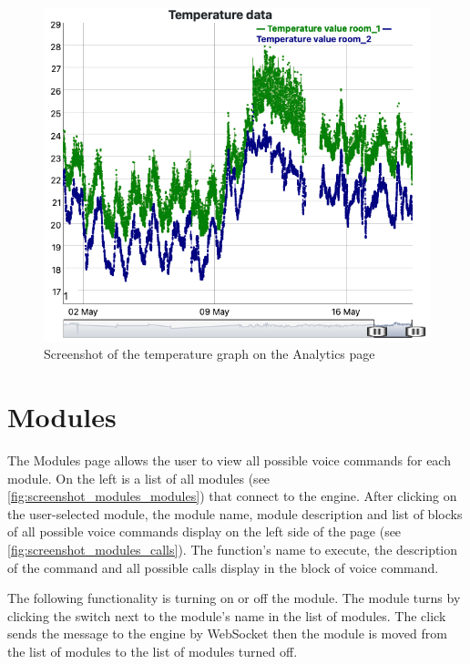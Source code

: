 \begin{figure}[H]
    \centering
    \includegraphics[width=\textwidth]{img/screenshot_analytics_graph.png}
    \caption{Screenshot of the temperature graph on the Analytics page}
    \label{fig:screenshot_analytics_graph}
\end{figure}

\section{Modules} \label{section:modules}

The Modules page allows the user to view all possible voice commands for each module. On the left is a list of all modules (see \cref{fig:screenshot_modules_modules}) that connect to the engine. After clicking on the user-selected module, the module name, module description and list of blocks of all possible voice commands display on the left side of the page (see \cref{fig:screenshot_modules_calls}). The function's name to execute, the description of the command and all possible calls display in the block of voice command.

The following functionality is turning on or off the module. The module turns by clicking the switch next to the module's name in the list of modules. The click sends the message to the engine by WebSocket then the module is moved from the list of modules to the list of modules turned off.

